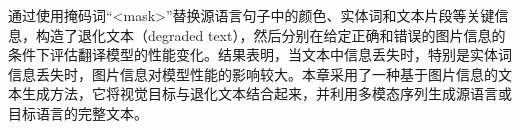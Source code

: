 通过使用掩码词“<mask>”替换源语言句子中的颜色、实体词和文本片段等关键信息，构造了退化文本（degraded text），然后分别在给定正确和错误的图片信息的条件下评估翻译模型的性能变化。结果表明，当文本中信息丢失时，特别是实体词信息丢失时，图片信息对模型性能的影响较大。本章采用了一种基于图片信息的文本生成方法，它将视觉目标与退化文本结合起来，并利用多模态序列生成源语言或目标语言的完整文本。


